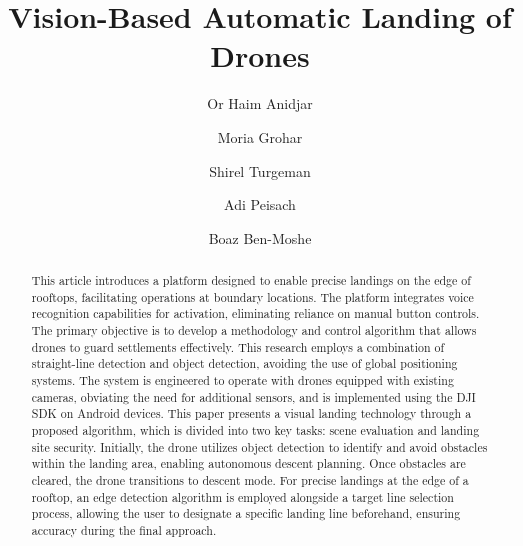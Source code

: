 \documentclass[3p,times]{elsarticle}
\begin{document}
    \begin{frontmatter}


        \title{Vision-Based Automatic Landing of Drones}




        \author[a,b,c,d]{Or Haim Anidjar}

        \author[a]{Moria Grohar}

        \author[a]{Shirel Turgeman}

        \author[a]{Adi Peisach}

        \author[a, b, c]{Boaz Ben-Moshe}


        \address[a]{School of Computer Science, Ariel University, Golan Heights 1, 4077625, Ariel, Israel.}

        \address[b]{Ariel Cyber Innovation Center, Ariel University, Golan Heights 1, 4077625, Ariel, Israel.}

        \address[c]{Kinematics and Computational Geometry Lab (K\&CG), Ariel University, Golan Heights 1, 4077625, Ariel, Israel.}

        \address[d]{Data Science and Artificial Intelligence Research Center, Ariel University, Golan Heights 1, 4077625, Ariel, Israel.}




        \begin{abstract}
            This article introduces a platform designed to enable precise landings on the edge of rooftops, facilitating operations at boundary locations. The platform integrates voice recognition capabilities for activation, eliminating reliance on manual button controls. The primary objective is to develop a methodology and control algorithm that allows drones to guard settlements effectively. This research employs a combination of straight-line detection and object detection, avoiding the use of global positioning systems. The system is engineered to operate with drones equipped with existing cameras, obviating the need for additional sensors, and is implemented using the DJI SDK on Android devices. This paper presents a visual landing technology through a proposed algorithm, which is divided into two key tasks: scene evaluation and landing site security. Initially, the drone utilizes object detection to identify and avoid obstacles within the landing area, enabling autonomous descent planning. Once obstacles are cleared, the drone transitions to descent mode. For precise landings at the edge of a rooftop, an edge detection algorithm is employed alongside a target line selection process, allowing the user to designate a specific landing line beforehand, ensuring accuracy during the final approach.


\end{abstract}
\end{frontmatter}
\end{document}
